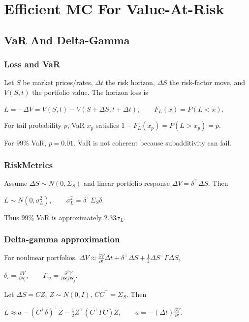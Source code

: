 \section{Efficient MC For Value-At-Risk}

\subsection{VaR And Delta-Gamma}

\subsubsection*{Loss and VaR}

Let $S$ be market prices/rates, $\Delta t$ the risk horizon, $\Delta S$ the risk-factor move, and $V(S,t)$ the portfolio value. The horizon loss is

$L=-\Delta V=V(S,t)-V(S+\Delta S,t+\Delta t),\qquad F_L(x)=P(L<x)$.

For tail probability $p$, VaR $x_p$ satisfies
$1-F_L(x_p)=P(L>x_p)=p$.

For 99\% VaR, $p=0.01$. VaR is not coherent because subadditivity can fail.

\subsubsection*{RiskMetrics}

Assume $\Delta S\sim N(0,\Sigma_S)$ and linear portfolio response $\Delta V=\delta^\top\Delta S$. Then

$L\sim N(0,\sigma_L^2),\qquad \sigma_L^2=\delta^\top\Sigma_S\delta$.

Thus 99\% VaR is approximately $2.33\sigma_L$.

\subsubsection*{Delta-gamma approximation}

For nonlinear portfolios,
$\Delta V\approx\frac{\partial V}{\partial t}\Delta t+\delta^\top\Delta S+\frac12\Delta S^\top\Gamma\Delta S$,

$\delta_i=\frac{\partial V}{\partial S_i},\qquad \Gamma_{ij}=\frac{\partial^2V}{\partial S_i\partial S_j}$.

Let $\Delta S=CZ$, $Z\sim N(0,I)$, $CC^\top=\Sigma_S$. Then

$L\approx a-(C^\top\delta)^\top Z-\frac12Z^\top(C^\top\Gamma C)Z,\qquad a=-(\Delta t)\frac{\partial V}{\partial t}$.

